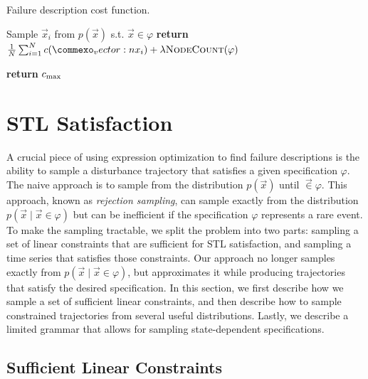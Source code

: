 \begin{algorithm}
\caption{Failure description cost function.} \label{alg:failure_description_cost_function}
\begin{algorithmic}[1]
     \label{line:fdcost_is_satisfiable}
            \State Sample $\vec{x}_i$ from $p(\vec{x})$ s.t. $\vec{x} \in \varphi$ \label{line:fdcost_sample_disturbance_trajectory}
        \EndFor
        \State \textbf{return} $\frac{1}{N} \sum_{i=1}^N  c(\vec{x}_i) + \lambda \textproc{NodeCount}(\varphi)$ \label{line:fdcost_compute_avg}
        
    \Else
        \State \textbf{return} $c_{\rm max}$ \label{line:fdcost_return_max_cost}
    \EndIf
    \EndFunction
\end{algorithmic}
\end{algorithm}


\section{STL Satisfaction}
A crucial piece of using expression optimization to find failure descriptions is the ability to sample a disturbance trajectory that satisfies a given specification $\varphi$. The naive approach is to sample from the distribution $p(\vec{x})$ until $\vec \in \varphi$. This approach, known as \emph{rejection sampling}, can sample exactly from the distribution $p(\vec{x} \mid \vec{x} \in \varphi)$ but can be inefficient if the specification $\varphi$ represents a rare event. To make the sampling tractable, we split the problem into two parts: sampling a set of linear constraints that are sufficient for STL satisfaction, and sampling a time series that satisfies those constraints. Our approach no longer samples exactly from $p(\vec{x} \mid \vec{x} \in \varphi)$, but approximates it while producing trajectories that satisfy the desired specification. In this section, we first describe how we sample a set of sufficient linear constraints, and then describe how to sample constrained trajectories from several useful distributions. Lastly, we describe a limited grammar that allows for sampling state-dependent specifications. 

\subsection{Sufficient Linear Constraints}

